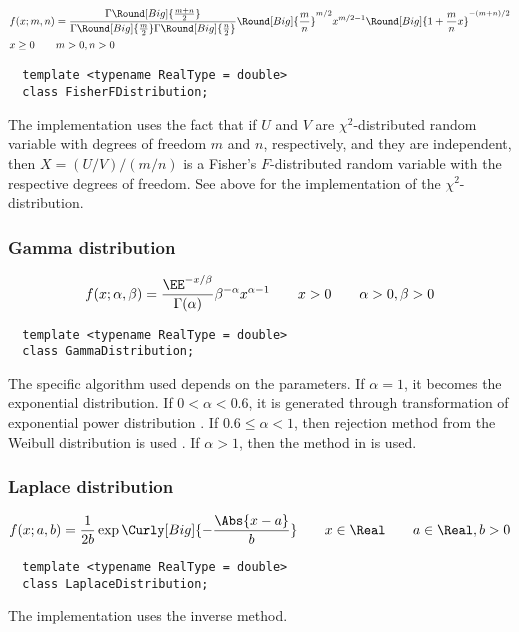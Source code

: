\begin{align*}
  & f(x;m,n) = \frac{\Gamma\Round[Big]{\frac{m + n}{2}}}{
    \Gamma\Round[Big]{\frac{m}{2}}\Gamma\Round[Big]{\frac{n}{2}}}
  \Round[Big]{\frac{m}{n}}^{m/2} x^{m / 2 - 1}
  \Round[Big]{1 + \frac{m}{n}x}^{-(m + n) / 2} \\
  & x \ge 0 \qquad m > 0, n > 0
\end{align*}
\begin{Verbatim}
  template <typename RealType = double>
  class FisherFDistribution;
\end{Verbatim}
The implementation uses the fact that if $U$ and $V$ are $\chi^2$-distributed
random variable with degrees of freedom $m$ and $n$, respectively, and they are
independent, then $X = (U / V) / (m / n)$ is a Fisher's $F$-distributed random
variable with the respective degrees of freedom. See above for the
implementation of the $\chi^2$-distribution.

\subsubsection{Gamma distribution}

\begin{equation*}
  f(x;\alpha,\beta) =
  \frac{\EE^{-x/\beta}}{\Gamma(\alpha)}\beta^{-\alpha}x^{\alpha-1}
  \qquad x > 0
  \qquad \alpha > 0, \beta > 0
\end{equation*}
\begin{Verbatim}
  template <typename RealType = double>
  class GammaDistribution;
\end{Verbatim}
The specific algorithm used depends on the parameters. If $\alpha = 1$, it
becomes the exponential distribution. If $0 < \alpha < 0.6$, it is generated
through transformation of exponential power distribution
\parencite[sec~2.6]{Devroye:1986gi}. If $0.6\le\alpha<1$, then rejection method
from the Weibull distribution is used \parencite[sec.~3.4]{Devroye:1986gi}. If
$\alpha > 1$, then the method in \textcite{Marsaglia:2000vq} is used.

\subsubsection{Laplace distribution}

\begin{equation*}
  f(x;a,b) = \frac{1}{2b}\exp\Curly[Big]{-\frac{\Abs{x - a}}{b}}
  \qquad x \in \Real
  \qquad a \in \Real, b > 0
\end{equation*}
\begin{Verbatim}
  template <typename RealType = double>
  class LaplaceDistribution;
\end{Verbatim}
The implementation uses the inverse method.

